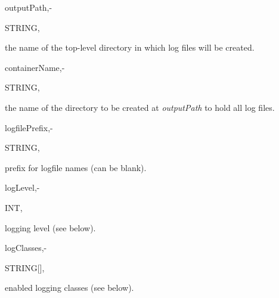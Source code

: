 \hfill
\begin{minipage}{\dimexpr\textwidth-2em}

        \medskip
        \begin{minipage}[t][][b]{9.5em}outputPath,\hfill{-}\end{minipage}
        \begin{minipage}[t][][b]{5.5em}STRING,\hfill\end{minipage}
        \begin{minipage}[t][][b]{\dimexpr\textwidth-15.5em}
            the name of the top-level directory in which log files will be created.
        \end{minipage}\vfill

        \medskip
        \begin{minipage}[t][][b]{9.5em}containerName,\hfill{-}\end{minipage}
        \begin{minipage}[t][][b]{5.5em}STRING,\hfill\end{minipage}
        \begin{minipage}[t][][b]{\dimexpr\textwidth-15.5em}
            the name of the directory to be created at \textit{outputPath} to hold all log files.
        \end{minipage}\vfill

        \medskip
        \begin{minipage}[t][][b]{9.5em}logfilePrefix,\hfill{-}\end{minipage}
        \begin{minipage}[t][][b]{5.5em}STRING,\hfill\end{minipage}
        \begin{minipage}[t][][b]{\dimexpr\textwidth-15.5em}
            prefix for logfile names (can be blank).
        \end{minipage}\vfill

        \medskip
        \begin{minipage}[t][][b]{9.5em}logLevel,\hfill{-}\end{minipage}
        \begin{minipage}[t][][b]{5.5em}INT,\hfill\end{minipage}
        \begin{minipage}[t][][b]{\dimexpr\textwidth-15.5em}
            logging level (see below).
        \end{minipage}\vfill

        \medskip
        \begin{minipage}[t][][b]{9.5em}logClasses,\hfill{-}\end{minipage}
        \begin{minipage}[t][][b]{5.5em}STRING[],\hfill\end{minipage}
        \begin{minipage}[t][][b]{\dimexpr\textwidth-15.5em}
            enabled logging classes (see below).
        \end{minipage}\vfill


\end{minipage}
